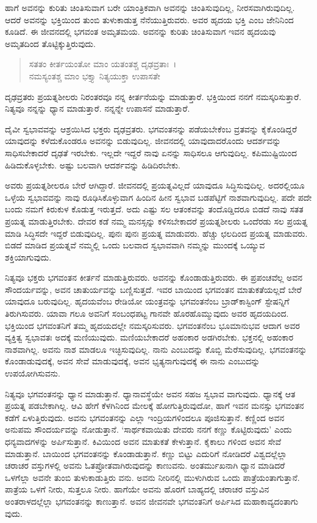 ಹಾಗೆ ಅವನನ್ನು ಕುರಿತು ಚಿಂತಿಸುವಾಗ ಬರೇ ಯಾಂತ್ರಿಕವಾಗಿ ಅವನನ್ನು ಚಿಂತಿಸುವುದಿಲ್ಲ, ನೀರಸವಾಗಿರುವುದಿಲ್ಲ. ಆದರೆ ಅವನನ್ನು ಭಕ್ತಿಯಿಂದ ತುಂಬಿ ತುಳುಕಾಡುತ್ತ ನೆನೆಯುತ್ತಿರುವರು. ಅವರ ಹೃದಯ ಭಕ್ತಿ ಎಂಬ ಜೇನಿನಿಂದ ಕೂಡಿದೆ. ಈ ಜೀವನದಲ್ಲಿ ಭಗವಂತ ಅಮೃತಮಯ. ಅವನನ್ನು ಕುರಿತು ಚಿಂತಿಸುವಾಗ ಇವನ ಹೃದಯವು ಅಮೃತದಿಂದ ತೊಟ್ಟಿಕ್ಕುತ್ತಿರುವುದು.

\begin{verse}
ಸತತಂ ಕೀರ್ತಯಂತೋ ಮಾಂ ಯತಂತಶ್ಚ ದೃಢವ್ರತಾಃ~।\\ನಮಸ್ಯಂತಶ್ಚ ಮಾಂ ಭಕ್ತ್ಯಾ ನಿತ್ಯಯುಕ್ತಾ ಉಪಾಸತೇ 
\end{verse}

{\small ದೃಢವ್ರತರು ಪ್ರಯತ್ನಶೀಲರು ನಿರಂತರವೂ ನನ್ನ ಕೀರ್ತನೆಯನ್ನು ಮಾಡುತ್ತಾರೆ. ಭಕ್ತಿಯಿಂದ ನನಗೆ ನಮಸ್ಕರಿಸುತ್ತಾರೆ. ನಿತ್ಯವೂ ನನ್ನನ್ನು ಧ್ಯಾನ ಮಾಡುತ್ತಾರೆ. ನನ್ನನ್ನೇ ಉಪಾಸನೆ ಮಾಡುತ್ತಾರೆ.}

ದೈವೀ ಸ್ವಭಾವವನ್ನು ಆಶ್ರಯಿಸಿದ ಭಕ್ತರು ದೃಢವ್ರತರು. ಭಗವಂತನನ್ನು ಪಡೆಯಬೇಕೆಂಬ ವ್ರತವನ್ನು ಕೈಕೊಂಡಿದ್ದರೆ ಯಾವುದನ್ನು ಕಳೆದುಕೊಂಡರೂ ಅವನನ್ನು ಬಿಡುವುದಿಲ್ಲ. ಜೀವನದಲ್ಲಿ ಯಾವುದಾದರೊಂದು ಆದರ್ಶವನ್ನು ಸಾಧಿಸಬೇಕಾದರೆ ದೃಢತೆ ಇರಬೇಕು. ಇಲ್ಲದೇ ಇದ್ದರೆ ನಾವು ಏನನ್ನು ಸಾಧಿಸಲೂ ಆಗುವುದಿಲ್ಲ. ಕಪಿಮುಷ್ಟಿಯಿಂದ ಹಿಡಿದುಕೊಳ್ಳಬೇಕು. ಅಷ್ಟು ಬಲವಾಗಿ ಆದರ್ಶವನ್ನು ಹಿಡಿದಿರಬೇಕು.

ಅವರು ಪ್ರಯತ್ನಶೀಲರೂ ಬೇರೆ ಆಗಿದ್ದಾರೆ. ಜೀವನದಲ್ಲಿ ಪ್ರಯತ್ನವಿಲ್ಲದೆ ಯಾವುದೂ ಸಿದ್ಧಿಸುವುದಿಲ್ಲ. ಅದರಲ್ಲಿಯೂ ಒಳ್ಳೆಯ ಸ್ವಭಾವವನ್ನು ನಾವು ರೂಢಿಸಿಕೊಳ್ಳುವಾಗ ಹಿಂದಿನ ಹೀನ ಸ್ವಭಾವ ಬಡಪೆಟ್ಟಿಗೆ ನಾಶವಾಗುವುದಿಲ್ಲ. ಪದೇ ಪದೇ ಬಂದು ನಮಗೆ ಕಿರುಕುಳ ಕೊಡುತ್ತ ಇರುತ್ತದೆ. ಅದು ಎಷ್ಟು ಸಲ ಆತಂಕವನ್ನು ತಂದೊಡ್ಡಿದರೂ ಬಿಡದೆ ನಾವು ಸತತ ಪ್ರಯತ್ನ ಮಾಡುತ್ತಿರಬೇಕು. ದೇವರ ಕಡೆ ನಮ್ಮ ಮನಸ್ಸನ್ನು ಕಳಿಸಬೇಕಾದರೆ ಪ್ರಯತ್ನಶೀಲರು ಒಂದೆರಡು ಸಲ ಪ್ರಯತ್ನ ಮಾಡಿ ಸಿದ್ಧಿಸದೇ ಇದ್ದರೆ ಬಿಡುವುದಿಲ್ಲ. ಪುನಃ ಪುನಃ ಪ್ರಯತ್ನ ಮಾಡುವರು. ಹೆಚ್ಚು ಛಲದಿಂದ ಪ್ರಯತ್ನ ಮಾಡುವರು. ಬಿಡದೆ ಮಾಡಿದ ಪ್ರಯತ್ನವೆ ನಮ್ಮಲ್ಲಿ ಒಂದು ಬಲವಾದ ಸ್ವಭಾವವಾಗಿ ನಮ್ಮನ್ನು ಮುಂದಕ್ಕೆ ಒಯ್ಯುವ ಶಕ್ತಿಯಾಗುವುದು.

ನಿತ್ಯವೂ ಭಕ್ತರು ಭಗವಂತನ ಕೀರ್ತನೆ ಮಾಡುತ್ತಿರುವರು. ಅವನನ್ನು ಕೊಂಡಾಡುತ್ತಿರುವರು. ಈ ಪ್ರಪಂಚವೆಲ್ಲ ಅವನ ಸೌಂದರ್ಯವನ್ನು, ಅವನ ಚಾತುರ್ಯವನ್ನು ಬಣ್ಣಿಸುತ್ತದೆ. ಇವರ ಬಾಯಿಂದ ಭಗವಂತನ ಮಾತುಕತೆಯಲ್ಲದೆ ಬೇರೆ ಯಾವುದೂ ಬರುವುದಿಲ್ಲ. ಹೃದಯವೆಂಬ ರೇಡಿಯೋ ಯಂತ್ರವನ್ನು ಭಗವಂತನೆಂಬ ಬ್ರಾಡ್​ಕಾಸ್ಟಿಂಗ್ ಸ್ಟೇಷನ್ನಿಗೆ ತಿರುಗಿಸುವರು. ಯಾವಾ ಗಲೂ ಅವನಿಗೆ ಸಂಬಂಧಪಟ್ಟ ಗಾನವೇ ಹೊರಹೊಮ್ಮುವುದು ಅವರ ಹೃದಯದಿಂದ. ಭಕ್ತಿಯಿಂದ ಭಗವಂತನಿಗೆ ತಮ್ಮ ಹೃದಯದಲ್ಲೇ ನಮಸ್ಕರಿಸುವರು. ಭಗವಂತನೆಂಬ ಭೂಮಾನುಭವ ಆದಾಗ ಅವರ ವ್ಯಕ್ತಿತ್ವ ಸ್ವಭಾವತಃ ಅದಕ್ಕೆ ಮಣಿಯುವುದು. ಮಣಿಯಬೇಕಾದರೆ ಅಹಂಕಾರ ಅಡಗಿರಬೇಕು. ಭಕ್ತನಲ್ಲಿ ಅಹಂಕಾರ ನಾಶವಾಗಿಲ್ಲ. ಅವನು ನಾಶ ಮಾಡಲೂ ಇಚ್ಛಿಸುವುದಿಲ್ಲ. ನಾನು ಎಂಬುದನ್ನು ಕೊಬ್ಬಿ ಮೆರೆಸುವುದಿಲ್ಲ. ಭಗವಂತನನ್ನು ಕೊಂಡಾಡುವುದಕ್ಕೆ, ಅವನ ಸೇವೆ ಮಾಡುವುದಕ್ಕೆ, ಅವನ ಭೃತ್ಯನಾಗುವುದಕ್ಕೆ ಈ ನಾನು ಎಂಬುದನ್ನು ಉಪಯೋಗಿಸುವನು.

ನಿತ್ಯವೂ ಭಗವಂತನನ್ನು ಧ್ಯಾನ ಮಾಡುತ್ತಾನೆ. ಧ್ಯಾನಾವಸ್ಥೆಯೇ ಅವನ ಸಹಜ ಸ್ವಭಾವ ವಾಗುವುದು. ಧ್ಯಾನಕ್ಕೆ ಆತ ಪ್ರಯತ್ನ ಪಡಬೇಕಾಗಿಲ್ಲ. ಆವಿ ಹೇಗೆ ಕೆಳಗಿನಿಂದ ಮೇಲಕ್ಕೆ ಹೋಗುತ್ತಿರುವುದೋ, ಹಾಗೆ ಇವನ ಮನಸ್ಸು ಭಗವಂತನ ಕಡೆಗೆ ಏಳುತ್ತಿರುವುದು. ಅವನು ಭಗವಂತನನ್ನು ಎಲ್ಲಾ ಇಂದ್ರಿಯಗಳಿಂದಲೂ ಪೂಜಿಸುತ್ತಾನೆ. ಕಣ್ಣಿಂದ ಅವನ ಅನುಪಮ ಸೌಂದರ್ಯವನ್ನು ನೋಡುತ್ತಾನೆ. ‘ಸಾರ್ಥಕವಾಯಿತು ದೇವರು ನನಗೆ ಕಣ್ಣು ಕೊಟ್ಟಿರುವುದು’ ಎಂದು ಧನ್ಯವಾದಗಳನ್ನು ಅರ್ಪಿಸುತ್ತಾನೆ. ಕಿವಿಯಿಂದ ಅವನ ಮಾತುಕತೆ ಕೇಳುತ್ತಾನೆ. ಕೈಕಾಲು ಗಳಿಂದ ಅವನ ಸೇವೆ ಮಾಡುತ್ತಾನೆ. ಬಾಯಿಂದ ಭಗವಂತನನ್ನು ಕೊಂಡಾಡುತ್ತಾನೆ. ಕಣ್ಣು ಬಿಟ್ಟು ಎದುರಿಗೆ ನೋಡಿದರೆ ವಿಶ್ವದಲ್ಲೆಲ್ಲಾ ಚರಾಚರ ವಸ್ತುಗಳಲ್ಲಿ ಅವನು ಓತಪ್ರೋತವಾಗಿರುವುದನ್ನು ಕಾಣುವನು. ಅಂತರ್ಮುಖನಾಗಿ ಧ್ಯಾನ ಮಾಡಿದರೆ ಒಳಗೆಲ್ಲಾ ಅವನೇ ತುಂಬಿ ತುಳುಕಾಡುತ್ತಿರು ವನು. ಅವನು ನೀರಿನಲ್ಲಿ ಮುಳುಗಿರುವ ಒಂದು ಪಾತ್ರೆಯಂತಾಗುತ್ತಾನೆ. ಪಾತ್ರೆಯ ಒಳಗೆ ನೀರು, ಸುತ್ತಲೂ ನೀರು. ಹಾಗೆಯೇ ಅವನು ಹೊರಗೆ ಬಾಹ್ಯದಲ್ಲಿ ಚರಾಚರ ವಸ್ತುವಿನ ಅಂತರಾಳದಲ್ಲೆಲ್ಲಾ ಭಗವಂತನನ್ನು ಕಾಣುತ್ತಾನೆ. ಅವನ ಜೀವನವೇ ಭಗವಂತನಿಗೆ ಅರ್ಪಿಸಿದ ಮಹಾಕಾವ್ಯದಂತಾಗು ವುದು.

